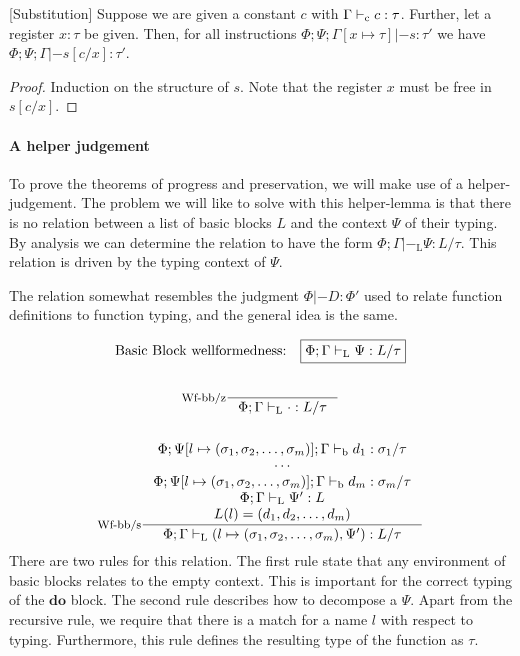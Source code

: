 \documentclass[a4paper, oneside, 10pt, draft]{memoir}
\begin{document}
\begin{lem}{[Substitution]}
  \label{lem:substitution}
  Suppose we are given a constant $c$ with $\Gamma |-_{\mathrm{c}} c :
  \tau$. Further, let a register $x : \tau$ be given. Then, for all
  instructions $\Phi;\Psi;\Gamma[x \mapsto \tau] |- s : \tau'$ we have
  $\Phi;\Psi;\Gamma |- s[c/x] : \tau'$.
\end{lem}
\begin{proof}
  Induction on the structure of $s$. Note that the register $x$ must
  be free in $s[c/x]$.
\end{proof}

\paragraph{A helper judgement}

\newcommand{\tpbb}{|-_{\mathrm{L}}}
To prove the theorems of progress and preservation, we will make use
of a helper-judgement. The problem we will like to solve with this
helper-lemma is that there is no relation between a list of basic
blocks $L$ and the context $\Psi$ of their typing. By analysis we can
determine the relation to have the form $\boxed{\Phi;\Gamma \tpbb \Psi :
  L / \tau}$. This relation is driven by the typing context of $\Psi$.

The relation somewhat resembles the judgment $\Phi |- D : \Phi'$ used
to relate function definitions to function typing, and the general
idea is the same.

\begin{gather*}
  \text{Basic Block wellformedness:} \quad \boxed{\Phi;\Gamma \tpbb
    \Psi : L / \tau}\\\\
  \inference[Wf-bb/z]{}{\Phi;\Gamma \tpbb \cdot : L / \tau}\\\\
  \inference[Wf-bb/s]{\Phi;\Psi[l\mapsto \sbundle];\Gamma \tpb d_1 :  \sigma_1 / \tau\\
  \dotsb\\
  \Phi;\Psi[l\mapsto \sbundle];\Gamma \tpb d_m : \sigma_m / \tau\\
  \Phi;\Gamma \tpbb \Psi' : L\\
  L(l) = \dbundle}
  {\Phi;\Gamma \tpbb (l \mapsto \sbundle, \Psi') : L / \tau}
\end{gather*}
There are two rules for this relation. The first rule state that any
environment of basic blocks relates to the empty context. This is
important for the correct typing of the $\mathbf{do}$ block. The
second rule describes how to decompose a $\Psi$. Apart from the
recursive rule, we require that there is a match for a name $l$ with
respect to typing. Furthermore, this rule defines the resulting type
of the function as $\tau$.
\end{document}
